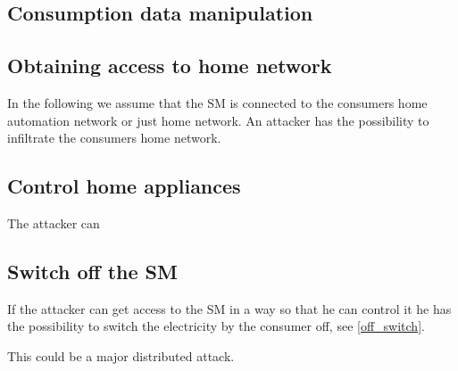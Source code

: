\subsection{Consumption data manipulation}

\subsection{Obtaining access to home network}
In the following we assume that the SM is connected to the consumers home automation network or just home network.
An attacker has the possibility to infiltrate the consumers home network.



\subsection{Control home appliances}
The attacker can


\subsection{Switch off the SM}
If the attacker can get access to the SM in a way so that he can control it he has the possibility to switch the electricity by the consumer off, see \cref{off_switch}.

This could be a major distributed attack.
